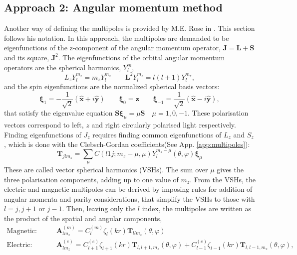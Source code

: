 \subsection{Approach 2: Angular momentum method}\label{2_rose}
Another way of defining the multipoles is provided by M.E. Rose in \cite{rose}. This section follows his notation. In this approach, the multipoles are demanded to be eigenfunctions of the z-component of the angular momentum operator, $\mathbf{J}=\mathbf{L}+\mathbf{S}$ and its square, $\mathbf{J}^2$. The eigenfunctions of the orbital angular momentum operators are the spherical harmonics, $Y_l^m$,
\begin{equation}\label{eq.sphharm}
    L_zY_l^{m_z}=m_zY_l^{m_z} \qquad \mathbf{L}^2Y_l^{m_z}=l(l+1)Y_l^{m_z},
\end{equation}
and the spin eigenfunctions are the normalized spherical basis vectors:
\begin{equation}\label{eq:S_ev}
    \boldsymbol{\xi}_1=-\frac{1}{\sqrt{2}}(\mathbf{\hat{x}}+i\mathbf{\hat{y}})\qquad
    \boldsymbol{\xi}_0=\mathbf{\hat{z}}\qquad
    \boldsymbol{\xi}_{-1}=\frac{1}{\sqrt{2}}(\mathbf{\hat{x}}-i\mathbf{\hat{y}}),
\end{equation}
that satisfy the eigenvalue equation $\mathbf{S}\boldsymbol{\xi}_{\mu}=\mu\mathbf{S}\quad \mu=1,0,-1$. These polarisation vectors correspond to left, $z$ and right circularly polarised light respectively.
Finding eigenfunctions of $J_z$ requires finding common eigenfunctions of $L_z$ and $S_z$, which is done with the Clebsch-Gordan coefficients(See App. \ref{app:multipoles}):
\begin{equation}
    \mathbf{T}_{jlm_z}=\sum_{\mu} C(l1j;m_z-\mu,\mu)Y_{l}^{m_z-\mu}(\theta,\varphi)\boldsymbol{\xi}_{\mu}
\end{equation}
These are called vector spherical harmonics (VSHs). The sum over $\mu$ gives the three polarisation components, adding up to one value of $m_z$. 
From the VSHs, the electric and magnetic multipoles can be derived by imposing rules for addition of angular momenta and parity considerations\cite{comparison}, that simplify the VSHs to those with $l=j, j+1$ or $j-1$. 
Then, leaving only the $l$ index, the multipoles are written as the product of the spatial and angular components,
\begin{align*}
    \text{Magnetic:}\qquad&\mathbf{A}^{(m)}_{lm_z}=C_l^{(m)}\zeta_l(kr)\mathbf{T}_{llm_z}(\theta,\varphi)\\
    \text{Electric:}\qquad&\mathbf{A}^{(e)}_{lm_z}=C_{l+1}^{(e)}\zeta_{l+1}(kr)\mathbf{T}_{l,l+1,m_z}(\theta,\varphi)+
    C_{l-1}^{(e)}\zeta_{l-1}(kr)\mathbf{T}_{l,l-1,m_z}(\theta,\varphi),
\end{align*}\\

